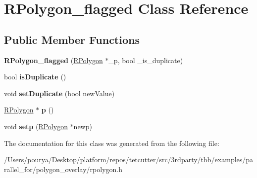 \hypertarget{classRPolygon__flagged}{}\section{R\+Polygon\+\_\+flagged Class Reference}
\label{classRPolygon__flagged}
\subsection*{Public Member Functions}
\begin{DoxyCompactItemize}
\item 
\hypertarget{classRPolygon__flagged_abc61f9181d69ca78f8108cbd363d77a2}{}{\bfseries R\+Polygon\+\_\+flagged} (\hyperlink{classRPolygon}{R\+Polygon} $\ast$\+\_\+p, bool \+\_\+is\+\_\+duplicate)\label{classRPolygon__flagged_abc61f9181d69ca78f8108cbd363d77a2}

\item 
\hypertarget{classRPolygon__flagged_a28542009ab4fff25f32ed4e8d86e1aa7}{}bool {\bfseries is\+Duplicate} ()\label{classRPolygon__flagged_a28542009ab4fff25f32ed4e8d86e1aa7}

\item 
\hypertarget{classRPolygon__flagged_ae6904f2ca56c03daee197a53dc1930bb}{}void {\bfseries set\+Duplicate} (bool new\+Value)\label{classRPolygon__flagged_ae6904f2ca56c03daee197a53dc1930bb}

\item 
\hypertarget{classRPolygon__flagged_aed16de3ebad82b6099147a399fb5dcbc}{}\hyperlink{classRPolygon}{R\+Polygon} $\ast$ {\bfseries p} ()\label{classRPolygon__flagged_aed16de3ebad82b6099147a399fb5dcbc}

\item 
\hypertarget{classRPolygon__flagged_a263a2ecf553aab8f1db28b4c2a60501d}{}void {\bfseries setp} (\hyperlink{classRPolygon}{R\+Polygon} $\ast$newp)\label{classRPolygon__flagged_a263a2ecf553aab8f1db28b4c2a60501d}

\end{DoxyCompactItemize}


The documentation for this class was generated from the following file\+:\begin{DoxyCompactItemize}
\item 
/\+Users/pourya/\+Desktop/platform/repos/tetcutter/src/3rdparty/tbb/examples/parallel\+\_\+for/polygon\+\_\+overlay/rpolygon.\+h\end{DoxyCompactItemize}
